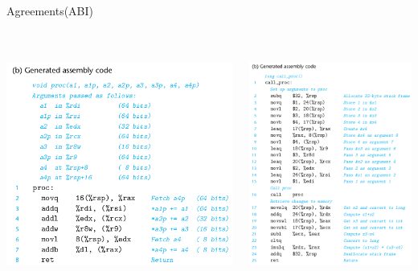 \documentclass[UKenglish]{beamer}
\begin{document}
\begin{frame}{Agreements(ABI)}
  \vspace{1.2cm}
\begin{center}
  \begin{columns}[onlytextwidth]
    \begin{column}{0.45\textwidth}
          \begin{minipage}[c][0.56\textheight][c]{\linewidth} 
          \includegraphics[width = 1\textwidth, height=8cm]{proc_assembly.png}
          \end{minipage}
        \end{column}

        \begin{column}{0.45\textwidth}
          \begin{minipage}[c][0.56\textheight][c]{\linewidth} 
          \includegraphics[width = 1\textwidth, height=8cm]{caller_assembly.png}
          \end{minipage}
    \end{column}
  \end{columns}
\end{center}

\end{frame}
\end{document}
